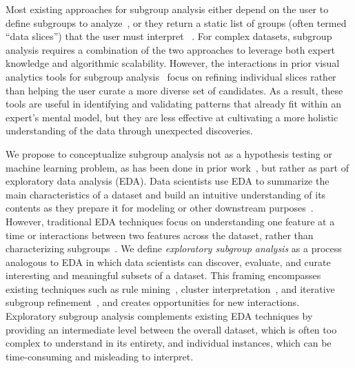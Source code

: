 Most existing approaches for subgroup analysis either depend on the user to define subgroups to analyze~\cite{cabrera_zeno_2023,cabrera_fairvis_2019,wu_errudite_2020}, or they return a static list of groups (often termed ``data slices'') that the user must interpret ~\cite{chung_slice_2020,pastor_looking_2021,eyuboglu_domino_2022}.
For complex datasets, subgroup analysis requires a combination of the two approaches to leverage both expert knowledge and algorithmic scalability.
However, the interactions in prior visual analytics tools for subgroup analysis~\cite{suresh_kaleidoscope_2023,zhang_sliceteller_2022,kwon_rmexplorer_2022,cabrera_zeno_2023} focus on refining individual slices rather than helping the user curate a more diverse set of candidates.
As a result, these tools are useful in identifying and validating patterns that already fit within an expert's mental model, but they are less effective at cultivating a more holistic understanding of the data through unexpected discoveries. %

We propose to conceptualize subgroup analysis not as a hypothesis testing or machine learning problem, as has been done in prior work~\cite{chung_slice_2020,eyuboglu_domino_2022}, but rather as part of exploratory data analysis (EDA).
Data scientists use EDA to summarize the main characteristics of a dataset and build an intuitive understanding of its contents as they prepare it for modeling or other downstream purposes~\cite{tukey_exploratory_1970}.
However, traditional EDA techniques focus on understanding one feature at a time or interactions between two features across the dataset, rather than characterizing subgroups~\cite{wongsuphasawat_voyager_2016,epperson_dead_2023,stolte_2002_polaris}.
We define \textit{exploratory subgroup analysis} as a process analogous to EDA in which data scientists can discover, evaluate, and curate interesting and meaningful subsets of a dataset. This framing encompasses existing techniques such as rule mining~\cite{zhang_sliceteller_2022}, cluster interpretation~\cite{Cavallo2019}, and iterative subgroup refinement~\cite{slyman_vlslice_2023}, and creates opportunities for new interactions.
Exploratory subgroup analysis complements existing EDA techniques by providing an intermediate level between the overall dataset, which is often too complex to understand in its entirety, and individual instances, which can be time-consuming and misleading to interpret.

